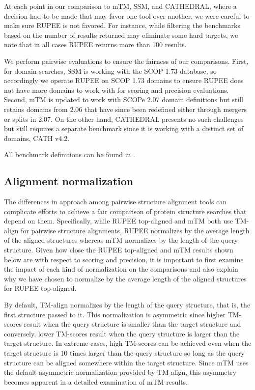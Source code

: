 \documentclass[10pt,letterpaper]{article}
\begin{document}
At each point in our comparison to mTM, SSM, and CATHEDRAL, where a decision had to be made that may favor one tool over another, we were careful to make sure RUPEE is not favored. 
For instance, while filtering the benchmarks based on the number of results returned may eliminate some hard targets, we note that in all cases RUPEE returns more than 100 results. 

We perform pairwise evaluations to ensure the fairness of our comparisons. 
First, for domain searches, SSM is working with the SCOP 1.73 database, so accordingly we operate RUPEE on SCOP 1.73 domains to ensure RUPEE does not have more domains to work with for scoring and precision evaluations. 
Second, mTM is updated to work with SCOPe 2.07 domain definitions but still retains domains from 2.06 that have since been redefined either through mergers or splits in 2.07. 
On the other hand, CATHEDRAL presents no such challenges but still requires a separate benchmark since it is working with a distinct set of domains, CATH v4.2. 

All benchmark definitions can be found in . 

\subsection*{Alignment normalization}

The differences in approach among pairwise structure alignment tools can complicate efforts to achieve a fair comparison of protein structure searches that depend on them.
Specifically, while RUPEE top-aligned and mTM both use TM-align for pairwise structure alignments, RUPEE normalizes by the average length of the aligned structures whereas mTM normalizes by the length of the query structure.
Given how close the RUPEE top-aligned and mTM results shown below are with respect to scoring and precision, it is important to first examine the impact of each kind of normalization on the comparisons and also explain why we have chosen to normalize by the average length of the aligned structures for RUPEE top-aligned.

By default, TM-align normalizes by the length of the query structure, that is, the first structure passed to it. 
This normalization is asymmetric since higher TM-scores result when the query structure is smaller than the target structure and conversely, lower TM-scores result when the query structure is larger than the target structure. 
In extreme cases, high TM-scores can be achieved even when the target structure is 10 times larger than the query structure so long as the query structure can be aligned somewhere within the target structure. 
Since mTM uses the default asymmetric normalization provided by TM-align, this asymmetry becomes apparent in a detailed examination of mTM results. 
\end{document}

